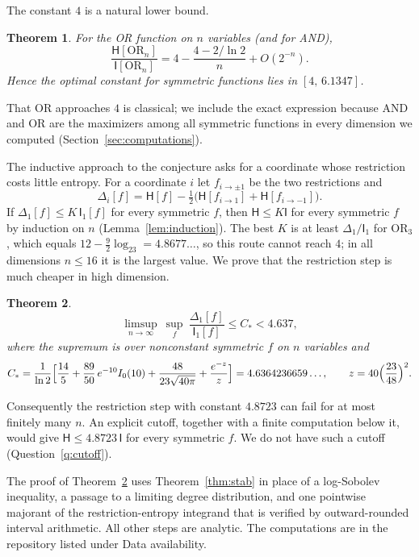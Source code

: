 \documentclass[11pt]{amsart}
\newtheorem{mainthm}{Theorem}
\theoremstyle{definition}
\theoremstyle{remark}
\newcommand{\HH}{\mathsf H}
\newcommand{\I}{\mathsf I}
\begin{document}
The constant $4$ is a natural lower bound.

\begin{mainthm}\label{thm:lower}
For the OR function on $n$ variables (and for AND),
\[
 \frac{\HH[\mathrm{OR}_n]}{\I[\mathrm{OR}_n]}=4-\frac{4-2/\ln2}{n}+O(2^{-n}).
\]
Hence the optimal constant for symmetric functions lies in $[4,\,6.1347]$.
\end{mainthm}

That OR approaches $4$ is classical; we include the exact expression because AND and OR are the maximizers among all symmetric functions in every dimension we computed (Section~\ref{sec:computations}).

The inductive approach to the conjecture asks for a coordinate whose restriction costs little entropy. For a coordinate $i$ let $f_{i\to\pm1}$ be the two restrictions and
\[
 \Delta_i[f]=\HH[f]-\tfrac12\bigl(\HH[f_{i\to1}]+\HH[f_{i\to-1}]\bigr).
\]
If $\Delta_1[f]\le K\,\I_1[f]$ for every symmetric $f$, then $\HH\le K\I$ for every symmetric $f$ by induction on $n$ (Lemma~\ref{lem:induction}). The best $K$ is at least $\Delta_1/\I_1$ for $\mathrm{OR}_3$, which equals $12-\tfrac92\log_23=4.8677\ldots$, so this route cannot reach $4$; in all dimensions $n\le16$ it is the largest value. We prove that the restriction step is much cheaper in high dimension.

\begin{mainthm}\label{thm:restriction}
\[
 \limsup_{n\to\infty}\ \sup_{f}\ \frac{\Delta_1[f]}{\I_1[f]}\le C_*<4.637,
\]
where the supremum is over nonconstant symmetric $f$ on $n$ variables and
\[
 C_*=\frac{1}{\ln2}\Bigl[\frac{14}{5}+\frac{89}{50}\,e^{-10}I_0(10)+\frac{48}{23\sqrt{40\pi}}+\frac{e^{-z}}{z}\Bigr]=4.6364236659\ldots,\qquad z=40\Bigl(\frac{23}{48}\Bigr)^2.
\]
\end{mainthm}

Consequently the restriction step with constant $4.8723$ can fail for at most finitely many $n$. An explicit cutoff, together with a finite computation below it, would give $\HH\le4.8723\,\I$ for every symmetric $f$. We do not have such a cutoff (Question~\ref{q:cutoff}).

The proof of Theorem~\ref{thm:restriction} uses Theorem~\ref{thm:stab} in place of a log-Sobolev inequality, a passage to a limiting degree distribution, and one pointwise majorant of the restriction-entropy integrand that is verified by outward-rounded interval arithmetic. All other steps are analytic. The computations are in the repository listed under Data availability.
\end{document}
